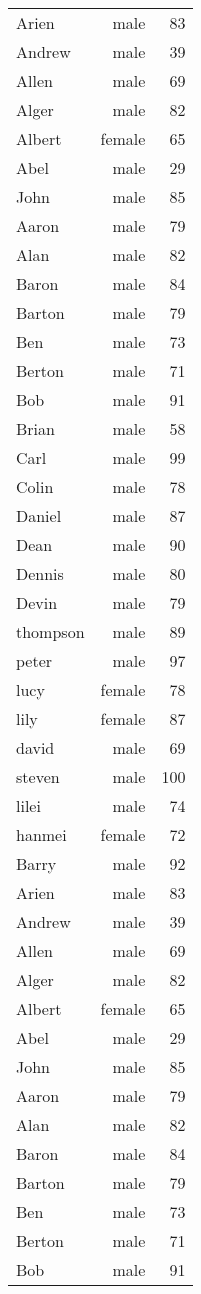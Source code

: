\documentclass{article}
\begin{document}
\begin{longtable}{l r r}
Arien & male & 83\\
Andrew &male & 39\\
Allen & male & 69\\
Alger & male & 82\\
Albert & female & 65\\
Abel & male & 29\\
John & male & 85\\
Aaron & male & 79\\
Alan & male & 82\\
Baron & male & 84\\
Barton & male & 79\\
Ben & male & 73\\
Berton & male & 71\\
Bob & male & 91\\
Brian & male & 58\\
Carl & male & 99\\
Colin & male & 78\\
Daniel & male & 87\\
Dean & male & 90\\
Dennis & male & 80\\
Devin & male & 79\\
thompson & male & 89 \\
peter & male & 97\\
lucy & female & 78\\
lily & female & 87\\
david & male & 69\\
steven & male & 100\\
lilei & male & 74\\
hanmei & female & 72\\
Barry & male & 92\\
Arien & male & 83\\
Andrew &male & 39\\
Allen & male & 69\\
Alger & male & 82\\
Albert & female & 65\\
Abel & male & 29\\
John & male & 85\\
Aaron & male & 79\\
Alan & male & 82\\
Baron & male & 84\\
Barton & male & 79\\
Ben & male & 73\\
Berton & male & 71\\
Bob & male & 91\\

\end{longtable}
\end{document}
